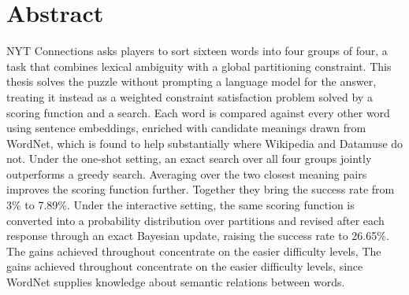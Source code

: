 \chapter*{Abstract}

NYT Connections asks players to sort sixteen words into four groups of four, a task that combines lexical ambiguity with a global partitioning constraint. This thesis solves the puzzle without prompting a language model for the answer, treating it instead as a weighted constraint satisfaction problem solved by a scoring function and a search. Each word is compared against every other word using sentence embeddings, enriched with candidate meanings drawn from WordNet, which is found to help substantially where Wikipedia and Datamuse do not. Under the one-shot setting, an exact search over all four groups jointly outperforms a greedy search. Averaging over the two closest meaning pairs improves the scoring function further. Together they bring the success rate from 3\% to 7.89\%. Under the interactive setting, the same scoring function is converted into a probability distribution over partitions and revised after each response through an exact Bayesian update, raising the success rate to 26.65\%. The gains achieved throughout concentrate on the easier difficulty levels, The gains achieved throughout concentrate on the easier difficulty levels, since WordNet supplies knowledge about semantic relations between words.